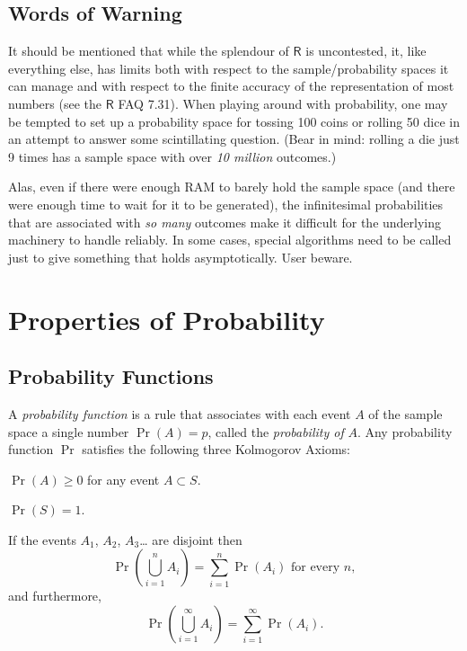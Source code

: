 \documentclass[captions=tableheading]{scrbook}
\begin{document}
\subsection{Words of Warning}
\label{sec-4-3-5}


It should be mentioned that while the splendour of \(\mathsf{R}\) is uncontested,  it, like everything else, has limits both with respect to the sample/probability spaces it can manage and with respect to the finite accuracy of the representation of most numbers (see the \(\mathsf{R}\) FAQ 7.31). When playing around with probability, one may be tempted to set up a probability space for tossing 100 coins or rolling 50 dice in an attempt to answer some scintillating question. (Bear in mind: rolling a die just 9 times has a sample space with over \emph{10 million} outcomes.)

Alas, even if there were enough RAM to barely hold the sample space (and there were enough time to wait for it to be generated), the infinitesimal probabilities that are associated with \emph{so many} outcomes make it difficult for the underlying machinery to handle reliably. In some cases, special algorithms need to be called just to give something
that holds asymptotically. User beware.
\section{Properties of Probability}
\label{sec-4-4}
\label{sec-Properties-of-Probability}
\subsection{Probability Functions}
\label{sec-4-4-1}
\label{sub-Probability-Functions}


A \emph{probability function} is a rule that associates with each event \(A\) of the sample space a single number \(\Pr(A)=p\), called the \emph{probability of} \(A\). Any probability function \(\Pr\) satisfies the following three Kolmogorov Axioms: 

\begin{ax}
\(\Pr(A)\geq0\) for any event \(A\subset S\).
\end{ax}

\begin{ax}
\(\Pr(S)=1\).
\end{ax}

\begin{ax}
If the events \(A_{1}\), \(A_{2}\), \(A_{3}\)\ldots{} are disjoint then
\begin{equation}
\Pr\left(\bigcup_{i=1}^{n}A_{i}\right)=\sum_{i=1}^{n}\Pr(A_{i})\mbox{ for every }n,
\end{equation}
and furthermore,
\begin{equation}
\Pr\left(\bigcup_{i=1}^{\infty}A_{i}\right)=\sum_{i=1}^{\infty}\Pr(A_{i}).
\end{equation}
\end{ax}
\end{document}
